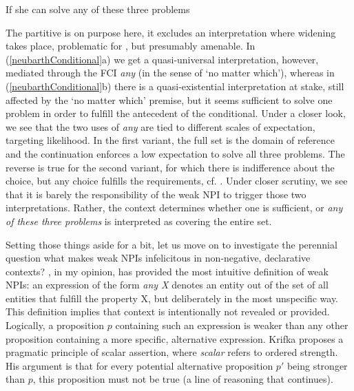 \documentclass[output=paper,colorlinks,citecolor=brown,
]{langscibook}
\begin{document}
  \begin{exe}
    \ex\label{neubarthConditional} If she can solve any of these three problems
    \begin{xlist}
    \end{xlist}
  \end{exe}

The partitive is on purpose here, it excludes an interpretation where widening takes place, problematic for
\citet{kadmonlandmann1993}, but presumably amenable. In (\ref{neubarthConditional}a) we get a quasi-universal interpretation,
however, mediated through the FCI \textit{any} (in the sense of `no matter which'), whereas in (\ref{neubarthConditional}b) there is a
quasi-existential interpretation at stake, still affected by the `no matter which' premise, but it seems sufficient to
solve one problem in order to fulfill the antecedent of the conditional. Under a closer look, we see that the two uses
of {\em any} are tied to different scales of expectation, targeting likelihood. In the first variant, the full set is the domain of reference and the continuation
enforces a low expectation to solve all three problems. The reverse is true for the second variant, for which there is indifference about the choice, but any choice fulfills the requirements, cf. \citet{dayal2004}. Under closer scrutiny, we see that it is barely the
responsibility of the weak NPI to trigger those two interpretations. Rather, the context determines whether one is
sufficient, or \textit{any of these three problems} is interpreted as covering the entire set.

Setting those things aside for a bit, let us move on to investigate the perennial question what makes weak NPIs infelicitous in
non-negative, declarative contexts? \citet{krifka1995}, in my opinion, has provided the most intuitive definition of weak NPIs:
an expression of the form {\em any X} denotes an entity out of the set of all entities that fulfill the property X, but
deliberately in the most unspecific way. This definition implies that context is intentionally not revealed or provided. Logically, a proposition $p$ containing such an expression is weaker than any other proposition containing
a more specific, alternative expression. Krifka proposes a pragmatic principle of scalar assertion, where \textit{scalar} refers to ordered strength. His argument is that for every potential alternative proposition $p'$ being stronger than
$p$, this proposition must not be true (a line of reasoning that \citealt{chierchia2004} continues).
\end{document}
